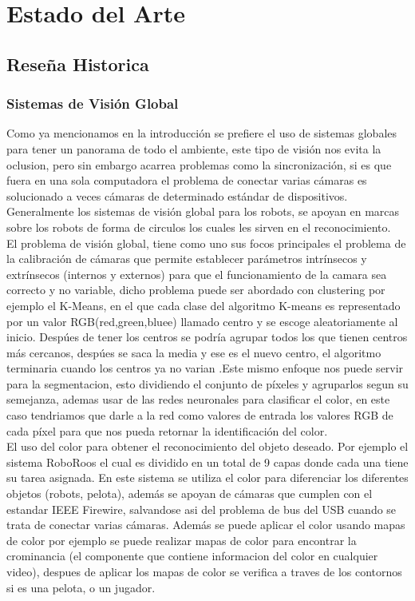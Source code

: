 \documentclass[conference]{IEEEtran}
\begin{document}
\section{Estado del Arte}
\subsection{Rese\~na Historica}
\subsubsection{\textbf{Sistemas de Visi\'on Global}}

Como ya mencionamos en la introducci\'on se prefiere el uso de sistemas globales para tener un panorama de todo el ambiente, este tipo de visi\'on nos evita la oclusion, pero sin embargo acarrea problemas como la sincronizaci\'on, si es que fuera en una sola computadora el problema de conectar varias c\'amaras es solucionado a veces c\'amaras de determinado est\'andar de dispositivos. Generalmente los sistemas de visi\'on global para los robots, se apoyan en marcas sobre los robots de forma de circulos los cuales les sirven  en el reconocimiento.\\
El problema de visi\'on global, tiene como uno sus focos principales el problema de la calibraci\'on de c\'amaras que permite establecer par\'ametros intr\'insecos y extr\'insecos (internos y externos) para que el funcionamiento de la camara sea correcto y no variable, dicho problema puede ser abordado con clustering por ejemplo el K-Means, en el que cada clase del algoritmo K-means es representado por un valor RGB(red,green,bluee) llamado centro  y se escoge aleatoriamente al inicio. Desp\'ues de tener los centros se podr\'ia agrupar  todos los que tienen centros m\'as cercanos, desp\'ues se saca la media y ese es el nuevo centro, el algoritmo terminaria cuando los centros ya no varian \cite{kelson_glo}.Este mismo enfoque nos puede servir para la segmentacion, esto dividiendo el conjunto de p\'ixeles y agruparlos segun su semejanza, ademas usar  de las redes neuronales para clasificar el color, en este caso tendriamos que darle a la red como valores de entrada los valores RGB de cada p\'ixel para que nos pueda retornar la identificaci\'on del color\cite{chabra_glo}.\\
El uso del color para obtener el reconocimiento del objeto deseado. Por ejemplo el sistema RoboRoos el cual es dividido en un total de 9 capas donde cada una tiene su tarea asignada. En este sistema se utiliza el color para diferenciar los diferentes objetos (robots, pelota), adem\'as se apoyan de c\'amaras que cumplen con el estandar IEEE Firewire, salvandose asi del problema de bus del USB cuando se trata de conectar varias c\'amaras\cite{ball_glo}. Adem\'as se puede aplicar el color usando mapas de color por ejemplo se puede realizar mapas de color para encontrar la crominancia (el componente que contiene informacion del color en cualquier video), despues de aplicar los mapas de color se verifica a traves de los contornos si es una pelota, o un jugador\cite{clau_glo}.
\\
\end{document}
